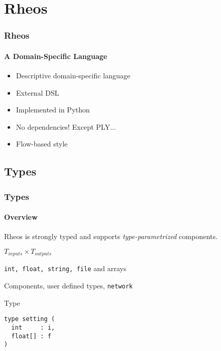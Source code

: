 \section{Rheos}

\begin{frame}
\frametitle{Rheos}
\framesubtitle{A Domain-Specific Language}

\begin{itemize}
\pause
\item Descriptive domain-specific language
\pause
\item External DSL
\pause
\item Implemented in Python
\pause
\item No dependencies! Except PLY...
\pause
\item Flow-based style
\end{itemize}

\end{frame}




\subsection*{Types}
\begin{frame}[fragile]
\frametitle{Types}
\framesubtitle{Overview}

Rheos is strongly typed and supports \emph{type-parametrized}
components.

\begin{description}
\pause
\item [Components:] $T_{inputs} \times T_{outputs}$
\pause
\item [Primitive types:] \verb|int, float, string, file| and arrays
\pause
\item [Record types:] Components, user defined types, \verb|network|
\end{description}

\pause
\begin{block}{Type}
\begin{verbatim}
type setting (
  int     : i,
  float[] : f
)
\end{verbatim}
\end{block}

\end{frame}



